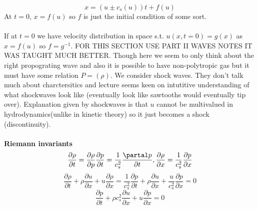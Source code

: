 \documentclass{article}
\begin{document}
$$
x = (u \pm c_s(u)) t + f(u)
$$
At $t=0$, $x= f(u)$ so $f$ is just the initial condition of some sort.\\\\
If at $t=0$ we have velocity distribution in space s.t. $u(x,t=0) = g(x)$ as $x= f(u)$ so $f= g^{-1}$.
FOR THIS SECTION USE PART II WAVES NOTES IT WAS TAUGHT MUCH BETTER. Though here we seem to only think about the right propograting wave and also it is possible to have non-polytropic gas but it must have some relation $P=(\rho)$. We consider shock waves. They don't talk much about charctersitics and lecture seems keen on intutitive understanding of what shockwaves look like (eventually look like sawtooths would eventually tip over). Explanation given by shockwaves is that $u$ cannot be multivalued in hydrodynamics(unlike in kinetic theory) so it just becomes a shock (discontinuity).\\\\
\textbf{Riemann invariants}\\
$$\frac{\partial \rho}{\partial t} = \frac{\partial \rho}{\partial p} \frac{\partial p}{\partial t}= \frac{1}{c_s^2} \frac{\partal p}{\partial t}, \frac{\partial \rho}{\partial x} = \frac{1}{c_s^2}\frac{\partial p}{\partial x}$$
$$
\frac{\partial \rho}{\partial t} + \rho \frac{\partial u}{\partial x} + u \frac{\partial \rho}{\partial x} = \frac{1}{c_s^2} \frac{\partial p}{\partial t} + \rho \frac{ \partial u}{\partial x} + \frac{u}{c_s^2}\frac{\partial p}{\partial x} = 0
$$
$$
\frac{\partial p}{\partial t} + \rho c_s^2 \frac{\partial u}{\partial x} + u \frac{\partial p}{\partial x} = 0
$$
\end{document}
